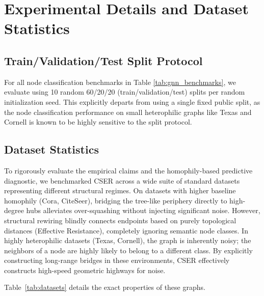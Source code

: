 \documentclass[10pt]{article} %
\begin{document}
\section{Experimental Details and Dataset Statistics}
\label{app:hyperparams}

\subsection{Train/Validation/Test Split Protocol}
For all node classification benchmarks in Table \ref{tab:gnn_benchmarks}, we evaluate using 10 random 60/20/20 (train/validation/test) splits per random initialization seed. This explicitly departs from using a single fixed public split, as the node classification performance on small heterophilic graphs like Texas and Cornell is known to be highly sensitive to the split protocol.

\subsection{Dataset Statistics}
To rigorously evaluate the empirical claims and the homophily-based predictive diagnostic, we benchmarked CSER across a wide suite of standard datasets representing different structural regimes. On datasets with higher baseline homophily (Cora, CiteSeer), bridging the tree-like periphery directly to high-degree hubs alleviates over-squashing without injecting significant noise. However, structural rewiring blindly connects endpoints based on purely topological distances (Effective Resistance), completely ignoring semantic node classes. In highly heterophilic datasets (Texas, Cornell), the graph is inherently noisy; the neighbors of a node are highly likely to belong to a different class. By explicitly constructing long-range bridges in these environments, CSER effectively constructs high-speed geometric highways for noise.

Table~\ref{tab:datasets} details the exact properties of these graphs.
\end{document}
